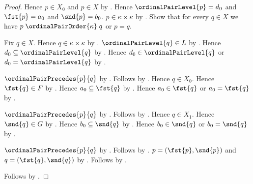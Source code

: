 \begin{proof}
    Hence $p\in X_0$ and $p\in X$ by \auto.
    Hence $\ordinalPairLevel{p}=d_0$ and $\fst{p}=a_0$ and
        $\snd{p}=b_0$.
    $p\in\kappa\times\kappa$ by .
    Show that for every $q\in X$ we have
        $p\mathrel{\ordinalPairOrder{\kappa}}q$ or $p=q$.
    \begin{subproof}
        Fix $q\in X$.
        Hence $q\in\kappa\times\kappa$ by .
        $\ordinalPairLevel{q}\in L$ by \auto.
        Hence $d_0\subseteq\ordinalPairLevel{q}$
            by .
        Hence $d_0\in\ordinalPairLevel{q}$ or
            $d_0=\ordinalPairLevel{q}$
            by .
        \begin{byCase}
                $\ordinalPairPrecedes{p}{q}$
                    by .
                Follows by .
                Hence $q\in X_0$.
                Hence $\fst{q}\in F$ by \auto.
                Hence $a_0\subseteq\fst{q}$
                    by .
                Hence $a_0\in\fst{q}$ or $a_0=\fst{q}$
                    by .
                \begin{byCase}
                        $\ordinalPairPrecedes{p}{q}$
                            by .
                        Follows by .
                        Hence $q\in X_1$.
                        Hence $\snd{q}\in G$ by \auto.
                        Hence $b_0\subseteq\snd{q}$
                            by .
                        Hence $b_0\in\snd{q}$ or $b_0=\snd{q}$
                            by .
                        \begin{byCase}
                                $\ordinalPairPrecedes{p}{q}$
                                    by .
                                Follows by .
                                $p=(\fst{p},\snd{p})$ and
                                    $q=(\fst{q},\snd{q})$ by
                                    .
                                Follows by .
                        \end{byCase}
                \end{byCase}
        \end{byCase}
    \end{subproof}
    Follows by \auto.
\end{proof}

